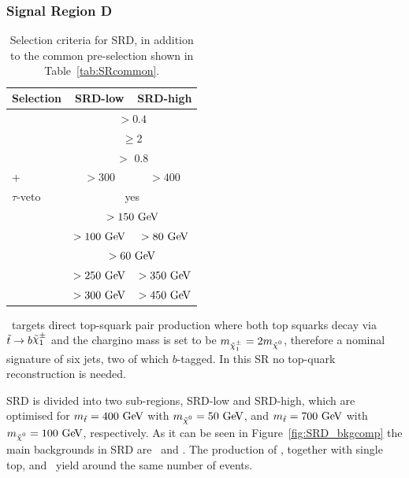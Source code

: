 			\subsubsection*{Signal Region D}

				\begin{table}
				  \caption{Selection criteria for SRD, in addition to the common pre-selection shown in Table~\ref{tab:SRcommon}.}
				  \begin{center}
				  \def\arraystretch{1.4}
				  \begin{tabular}{lcc}
				    \toprule
				    {\textbf{Selection}}       & {\textbf{SRD-low}} & {\textbf{SRD-high}} \\
				    \toprule
				    \dphijetthreemet     & \multicolumn{2}{c}{$>0.4$}     \\ %
				    \nBJet      & \multicolumn{2}{c}{$\geq$2}    \\%
				    \drbjetbjet     & \multicolumn{2}{c}{$>$ 0.8}    \\ %
				    \ptbzero+\ptbone & $>300$ \gev    & $>400$ \gev     \\ %
				    $\tau$-veto          & \multicolumn{2}{c}{yes}        \\ %
				    \ptone\              & \multicolumn{2}{c}{$>150\GeV$} \\ %
				    \ptthree\            & $>100\GeV$    & $>80\GeV$      \\ %
				    \ptfour\             & \multicolumn{2}{c}{$>60\GeV$}  \\ %
				    \mtbmin\             & $>250\GeV$    & $>350\GeV$     \\ %
				    \mtbmax\             & $>300\GeV$    & $>450\GeV$     \\ 
				    \bottomrule
				  \end{tabular}
				  \end{center}
				  \label{tab:SignalRegionD}
				\end{table}
				\SRD\ targets direct top-squark pair production where both top squarks decay via $\stop\to b \chinoonepm$ and the chargino mass is set to be $m_{\chinoonepm}=2\mLSP$, therefore a nominal signature of six jets, two of which $b$-tagged. In this \ac{SR} no top-quark reconstruction is needed. 

				SRD is divided into two sub-regions, SRD-low and SRD-high, which are optimised for $\mstop = 400\GeV$ with $\mLSP=50\GeV$, and $\mstop = 700\GeV$ with $\mLSP=100\GeV$, respectively. As it can be seen in Figure~\ref{fig:SRD_bkgcomp} the main backgrounds in SRD are \Zjets\ and \Wjets. The production of \ttbar, together with single top, and \ttV\ yield around the same number of events.

